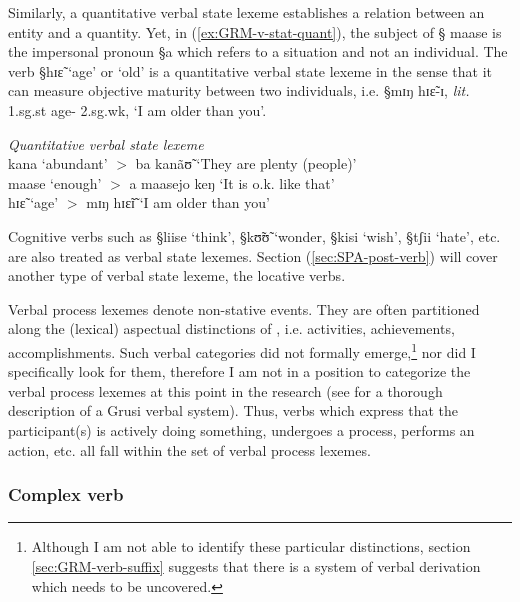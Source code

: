 Similarly, a quantitative verbal state lexeme  establishes a relation between an
entity and a quantity. Yet, in (\ref{ex:GRM-v-stat-quant}), the subject of   {\S
maase} is the impersonal pronoun {\S a} which refers to a situation and not an
individual. The verb {\S hɪɛ̃}  `age' or `old'  is a quantitative verbal state
lexeme in the sense that it can measure objective maturity between
two individuals, i.e. {\S mɪŋ hɪɛ̃-ɪ}, {\it lit.} {\sc 1.sg.st} age-{\sc
2.sg.wk}, `I am older than you'. 


\begin{exe}
\ex\label{ex:GRM-v-stat-quant}{\it Quantitative verbal state lexeme}\\
 {\I kana}  `abundant'  $>$ {\I ba kanãʊ̃} `They are plenty (people)' \\
{\I maase} `enough'  $>$   {\I a maasejo keŋ} `It is o.k. like that'\\
{\I hɪɛ̃} `age' $>$ {\I mɪŋ hɪɛ̃ɪ̃} `I am older than you'
\end{exe}

Cognitive verbs such as {\S liise} `think',  {\S kʊ̃ʊ̃} `wonder, 
{\S kisi} `wish',    {\S tʃii} `hate', etc.  are also treated as verbal state
lexemes. Section (\ref{sec:SPA-post-verb}) will  cover another
type  of verbal state lexeme,  the locative verbs. 

Verbal process lexemes denote non-stative events. They are often partitioned
along the
(lexical) aspectual distinctions of  \cite{Vend57}, i.e. activities, 
achievements, accomplishments. Such verbal categories did not formally
emerge,\footnote{Although I am not able to identify these particular
distinctions, section \ref{sec:GRM-verb-suffix} suggests that there is a system
of verbal derivation which needs to be uncovered.}
nor did I specifically look for them, therefore I am not in a position to
categorize the verbal process lexemes at this point in the research (see
\citet[51]{Bonv88} for a thorough
description of a Grusi verbal system).   Thus, verbs which express that the
participant(s) is actively doing something, undergoes a process, performs an
action, etc. all fall within the  set of verbal process
lexemes. 



\subsubsection{Complex verb}
\label{sec:GRM-complex-verb}

